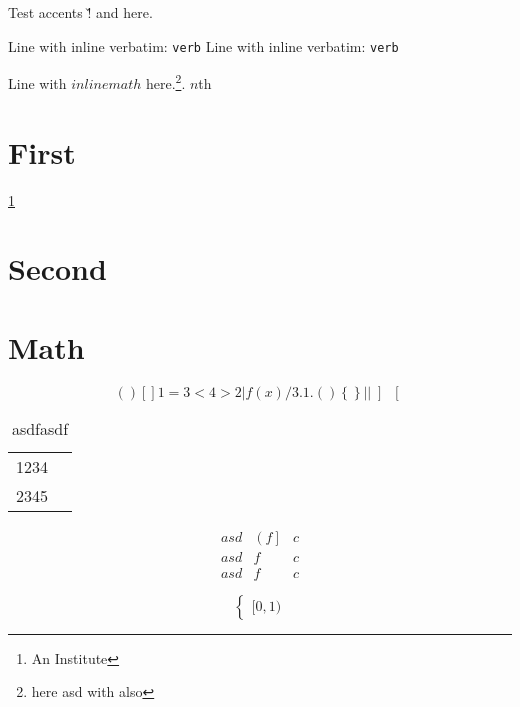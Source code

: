 \documentclass{article}
\begin{document}
Test accents \v! and \v@ here.

Line with inline verbatim: \verb+verb+
Line with inline verbatim: \verb*+verb+

Line with $inline math$ here.\footnote{here {asd} with \cmd also}. $n$th

\section{First}
\label{sec:first}

\ref{sec:first}
\pageref{sec:second}
\nocite{bibkey0}
\cite{bibkey1}
\citet*{bibkey2}
\citep{bibkey3}
\citep[e.g.][]{bibkey4}

\section{Second}
\label{sec:second}

\author{A. Author\thanks{An Institute}}

\section{Math}
\label{sec:math}

\begin{equation}
  ( )
  [ ]
  1 = 3 < 4 > 2 | f(x) / 3 .1.
  \left( \right)
  \left\{ \right\}
  \left\lvert \right\rvert
  \left] \right[
\end{equation}

\begin{table}
  \centering
  \caption{asdfasdf}
  \label{tab:}
  \begin{tabular}{cr}
    1234 \\
    2345 \\
  \end{tabular}
\end{table}

\begin{equation}
  \begin{array}{ccc}
    asd & \left( f \right] & c \\
    asd & f & c \\
    asd & f & c
  \end{array}
\end{equation}

\begin{equation}
  \begin{cases}
    [0,1)
  \end{cases}
\end{equation}
\end{document}
